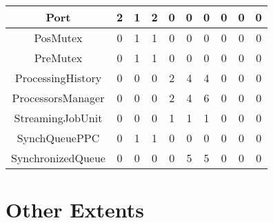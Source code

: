 \begin{tabular}{|c|c|c|c|c|c|c|c|c|c|}
 \hline 
 Port & 2 & 1 & 2 & 0 & 0 & 0 & 0 & 0 & 0 \\
 \hline 
 PosMutex & 0 & 1 & 1 & 0 & 0 & 0 & 0 & 0 & 0 \\
 \hline 
 PreMutex & 0 & 1 & 1 & 0 & 0 & 0 & 0 & 0 & 0 \\
 \hline 
 ProcessingHistory & 0 & 0 & 0 & 2 & 4 & 4 & 0 & 0 & 0 \\
 \hline 
 ProcessorsManager & 0 & 0 & 0 & 2 & 4 & 6 & 0 & 0 & 0 \\
 \hline 
 StreamingJobUnit & 0 & 0 & 0 & 1 & 1 & 1 & 0 & 0 & 0 \\
 \hline 
 SynchQueuePPC & 0 & 1 & 1 & 0 & 0 & 0 & 0 & 0 & 0 \\
 \hline 
 SynchronizedQueue & 0 & 0 & 0 & 0 & 5 & 5 & 0 & 0 & 0 \\
 \hline

\end{tabular}

\section{Other Extents}


